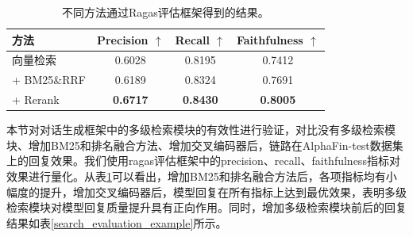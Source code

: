 \begin{table}
	\caption{\label{search_module_evaluation}不同方法通过Ragas评估框架得到的结果。}
	\centering{}%
	\small 
	\begin{tabular}{lccc}
		\toprule[2pt]
		方法 & Precision $\uparrow$ & Recall $\uparrow$ & Faithfulness $\uparrow$ \\
		\hline
		向量检索 & 0.6028 & 0.8195 & 0.7412 \\
		+ BM25\&RRF & 0.6189 & 0.8324 & 0.7691 \\
		+ Rerank & \textbf{0.6717} & \textbf{0.8430} & \textbf{0.8005} \\
		\bottomrule[2pt]
	\end{tabular}
\end{table}

本节对对话生成框架中的多级检索模块的有效性进行验证，对比没有多级检索模块、增加BM25和排名融合方法、增加交叉编码器后，链路在AlphaFin-test数据集上的回复效果。我们使用ragas评估框架中的precision、recall、faithfulness指标对效果进行量化。从表\ref{search_module_evaluation}可以看出，增加BM25和排名融合方法后，各项指标均有小幅度的提升，增加交叉编码器后，模型回复在所有指标上达到最优效果，表明多级检索模块对模型回复质量提升具有正向作用。同时，增加多级检索模块前后的回复结果如表\ref{search_evaluation_example}所示。

